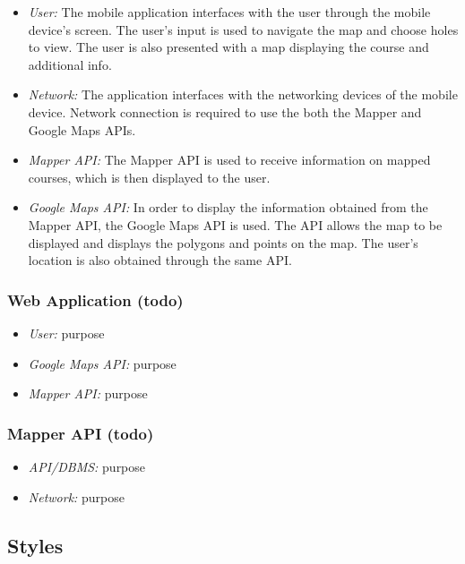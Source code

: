 \documentclass{article}
\begin{document}
    \begin{itemize}
        \item \textit{User:} The mobile application interfaces with the user
            through the mobile device's screen. The user's input is used to
            navigate the map and choose holes to view. The user is also
            presented with a map displaying the course and additional info.
        \item \textit{Network:} The application interfaces with the networking
            devices of the mobile device. Network connection is required to use
            the both the Mapper and Google Maps APIs.
        \item \textit{Mapper API:} The Mapper API is used to receive
            information on mapped courses, which is then displayed to the user.
        \item \textit{Google Maps API:} In order to display the information
            obtained from the Mapper API, the Google Maps API is used. The API
            allows the map to be displayed and displays the polygons and points
            on the map. The user's location is also obtained through the same
            API.
    \end{itemize}

    \subsubsection{Web Application (todo)}

    \begin{itemize}
        \item \textit{User:} purpose
        \item \textit{Google Maps API:} purpose
        \item \textit{Mapper API:} purpose
    \end{itemize}

    \subsubsection{Mapper API (todo)}

    \begin{itemize}
        \item \textit{API/DBMS:} purpose
        \item \textit{Network:} purpose
    \end{itemize}

    \subsection{Styles}
\end{document}
